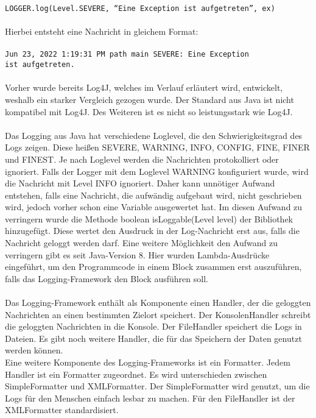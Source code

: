 {    \texttt{LOGGER.log(Level.SEVERE, \enquote{Eine Exception ist aufgetreten}, ex)}
    \\
    \\
    Hierbei entsteht eine Nachricht in gleichem Format:
    \\
    \\
    \hspace*{10mm}
    \texttt{Jun 23, 2022 1:19:31 PM path main SEVERE: Eine Exception
    \\
    \hspace*{30mm} ist aufgetreten.}
    \\
    \\
    Vorher wurde bereits Log4J, welches im Verlauf erläutert wird, entwickelt, weshalb ein starker Vergleich gezogen wurde.
    Der Standard aus Java ist nicht kompatibel mit Log4J.
    Des Weiteren ist es nicht so leistungsstark wie Log4J.
    \\
    \\
    Das Logging aus Java hat verschiedene Loglevel, die den Schwierigkeitsgrad des Logs zeigen.
    Diese heißen SEVERE, WARNING, INFO, CONFIG, FINE, FINER und FINEST.
    Je nach Loglevel werden die Nachrichten protokolliert oder ignoriert.
    Falls der Logger mit dem Loglevel WARNING konfiguriert wurde, wird die Nachricht mit Level INFO ignoriert.
    Daher kann unnötiger Aufwand entstehen, falls eine Nachricht, die aufwändig aufgebaut wird, nicht geschrieben wird, jedoch vorher schon eine Variable ausgewertet hat.
    Im diesen Aufwand zu verringern wurde die Methode boolean isLoggable(Level level) der Bibliothek hinzugefügt.
    Diese wertet den Ausdruck in der Log-Nachricht erst aus, falls die Nachricht geloggt werden darf.
    Eine weitere Möglichkeit den Aufwand zu verringern gibt es seit Java-Version 8.
    Hier wurden Lambda-Ausdrücke eingeführt, um den Programmcode in einem Block zusammen erst auszuführen, falls das Logging-Framework den Block ausführen soll.
    \\
    \\
    Das Logging-Framework enthält als Komponente einen Handler, der die geloggten Nachrichten an einen bestimmten Zielort speichert.
    Der KonsolenHandler schreibt die geloggten Nachrichten in die Konsole.
    Der FileHandler speichert die Logs in Dateien.
    Es gibt noch weitere Handler, die für das Speichern der Daten genutzt werden können.
    \\
    Eine weitere Komponente des Logging-Frameworks ist ein Formatter.
    Jedem Handler ist ein Formatter zugeordnet.
    Es wird unterschieden zwischen SimpleFormatter und XMLFormatter.
    Der SimpleFormatter wird genutzt, um die Logs für den Menschen einfach lesbar zu machen.
    Für den FileHandler ist der XMLFormatter standardisiert.
}\autocite{rheinwerk, examples}


